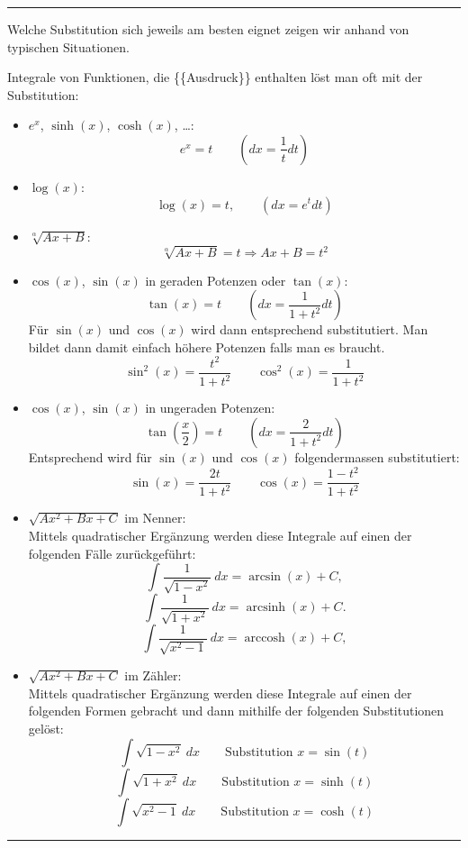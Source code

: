 \documentclass[a4paper,landscape,8pt]{extarticle}
\newcommand{\sep}{\vspace{5pt}\noindent\hrule\vspace{5pt}}
\DeclareMathOperator{\arcsinh}{arcsinh}
\DeclareMathOperator{\arccosh}{arccosh}
\begin{document}
\begin{multicols*}{4}
\sep

\Trick Welche Substitution sich jeweils am besten eignet zeigen wir anhand von
typischen Situationen.

Integrale von Funktionen, die \{\{Ausdruck\}\} enthalten löst man oft mit der
Substitution:
\begin{itemize}[label=$\star$]
\item $e^x$, $\sinh(x)$, $\cosh(x)$, \ldots:
\[
e^x = t \qquad (dx = \frac{1}{t} dt)
\]
\item $\log(x)$:
\[
\log(x) = t, \qquad (dx = e^t dt)
\]
\item $\sqrt[\alpha]{Ax + B}$:
\[
\sqrt[\alpha]{Ax + B} = t \Rightarrow Ax + B = t^2
\]
\item $\cos(x)$, $\sin(x)$ in geraden Potenzen oder $\tan(x)$:
\[
\tan(x) = t \qquad \left(dx = \frac{1}{1 + t^2} dt \right)
\]
Für $\sin(x)$ und $\cos(x)$ wird dann entsprechend substitutiert. Man bildet
dann damit einfach höhere Potenzen falls man es braucht.
\[
\sin^{2}(x)=\frac{t^2}{1+t^2}
\qquad 
\cos^2(x) = \frac{1}{1 + t^2}
\]
\item $\cos(x)$, $\sin(x)$ in ungeraden Potenzen:
\[
\tan\left(\frac{x}{2}\right) = t \qquad \left(dx = \frac{2}{1 + t^2} dt\right)
\]
Entsprechend wird für $\sin(x)$ und $\cos(x)$ folgendermassen substitutiert:
\[
\sin(x) = \frac{2t}{1 + t^2}
\qquad
\cos(x) = \frac{1-t^2}{1 + t^2}
\]
\item $\sqrt{Ax^2 + Bx + C}$ im Nenner:\\
Mittels quadratischer Ergänzung werden diese Integrale auf einen der folgenden
Fälle zurückgeführt:
\[
\int \frac{1}{\sqrt{1 - x^2}} \ dx = \arcsin(x) + C,
\]
\[
\int \frac{1}{\sqrt{1+x^2}} \ dx = \arcsinh(x) + C.
\]
\[
\int \frac{1}{\sqrt{x^2-1}} \ dx = \arccosh(x) + C,
\]

\item $\sqrt{Ax^2 + Bx + C}$ im Zähler:\\
Mittels quadratischer Ergänzung werden diese Integrale auf einen der folgenden
Formen gebracht und dann mithilfe der folgenden Substitutionen gelöst:
\[
\int \sqrt{1-x^2} \ dx \qquad \text{Substitution } x= \sin(t)
\]
\[
\int \sqrt{1+x^2} \ dx \qquad \text{Substitution } x= \sinh(t)
\]
\[
\int \sqrt{x^2-1} \ dx \qquad \text{Substitution } x= \cosh(t)
\]

\end{itemize}

\begin{warmup}

\sep


\end{warmup}
\end{multicols*}
\end{document}
